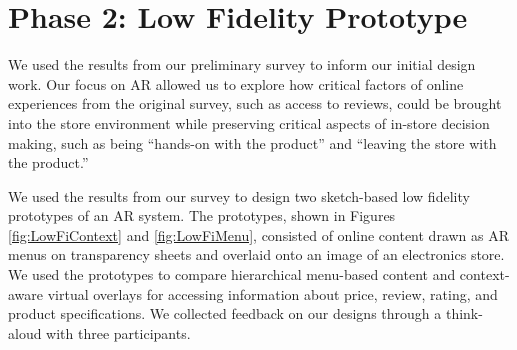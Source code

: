 \section{Phase 2: Low Fidelity Prototype}
We used the results from our preliminary survey to inform our initial design work. Our focus on AR allowed us to explore how critical factors of online experiences from the original survey, such as access to reviews, could be brought into the store environment while preserving critical aspects of in-store decision making, such as being ``hands-on with the product'' and ``leaving the store with the product.'' 

We used the results from our survey to design two sketch-based low fidelity prototypes of an AR system. 
The prototypes, shown in Figures \ref{fig:LowFiContext} and \ref{fig:LowFiMenu}, consisted of online content drawn as AR menus on transparency sheets and overlaid onto an image of an electronics store. 
We used the prototypes to compare hierarchical menu-based content and context-aware virtual overlays for accessing information about price, review, rating, and product specifications. We collected feedback on our designs through a think-aloud with three participants.

